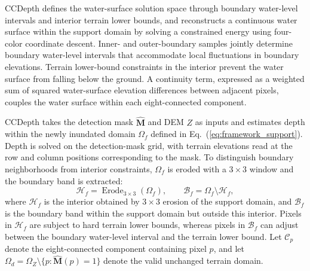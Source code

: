 \documentclass[authoryear,preprint,12pt]{elsarticle}
\begin{document}
CCDepth defines the water-surface solution space through boundary water-level intervals and interior terrain lower bounds, and reconstructs a continuous water surface within the support domain by solving a constrained energy using four-color coordinate descent. Inner- and outer-boundary samples jointly determine boundary water-level intervals that accommodate local fluctuations in boundary elevations. Terrain lower-bound constraints in the interior prevent the water surface from falling below the ground. A continuity term, expressed as a weighted sum of squared water-surface elevation differences between adjacent pixels, couples the water surface within each eight-connected component.

CCDepth takes the detection mask \(\hat{\mathbf M}\) and DEM \(Z\) as inputs and estimates depth within the newly inundated domain \(\Omega_f\) defined in Eq.~(\ref{eq:framework_support}). Depth is solved on the detection-mask grid, with terrain elevations read at the row and column positions corresponding to the mask. To distinguish boundary neighborhoods from interior constraints, \(\Omega_f\) is eroded with a \(3\times3\) window and the boundary band is extracted:
\begin{equation}\label{eq:ccdepth_domains}
 \mathcal H_f=\operatorname{Erode}_{3\times3}(\Omega_f),\qquad
 \mathcal B_f=\Omega_f\setminus\mathcal H_f,
\end{equation}
where \(\mathcal H_f\) is the interior obtained by \(3\times3\) erosion of the support domain, and \(\mathcal B_f\) is the boundary band within the support domain but outside this interior. Pixels in \(\mathcal H_f\) are subject to hard terrain lower bounds, whereas pixels in \(\mathcal B_f\) can adjust between the boundary water-level interval and the terrain lower bound. Let \(\mathcal C_p\) denote the eight-connected component containing pixel \(p\), and let \(\Omega_d=\Omega_Z\setminus\{p:\hat{\mathbf M}(p)=1\}\) denote the valid unchanged terrain domain.
\end{document}

